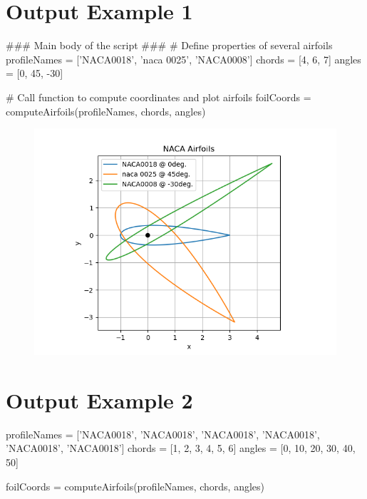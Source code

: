 \documentclass{article}
\begin{document}
\section*{Output Example 1}

\begin{python}
### Main body of the script ### 
# Define properties of several airfoils
profileNames = ['NACA0018', 'naca 0025', 'NACA0008']
chords = [4, 6, 7]
angles = [0, 45, -30]

# Call function to compute coordinates and plot airfoils
foilCoords = computeAirfoils(profileNames, chords, angles)
\end{python}

\begin{figure}[h]
    \centering
    \includegraphics[width=\textwidth]{exOutput.png}
\end{figure}

\newpage

\section*{Output Example 2}

\begin{python}
    profileNames = ['NACA0018', 'NACA0018', 'NACA0018', 
                    'NACA0018', 'NACA0018', 'NACA0018']
    chords = [1, 2, 3, 4, 5, 6]
    angles = [0, 10, 20, 30, 40, 50]
    
    foilCoords = computeAirfoils(profileNames, chords, angles)
\end{python}
\end{document}
